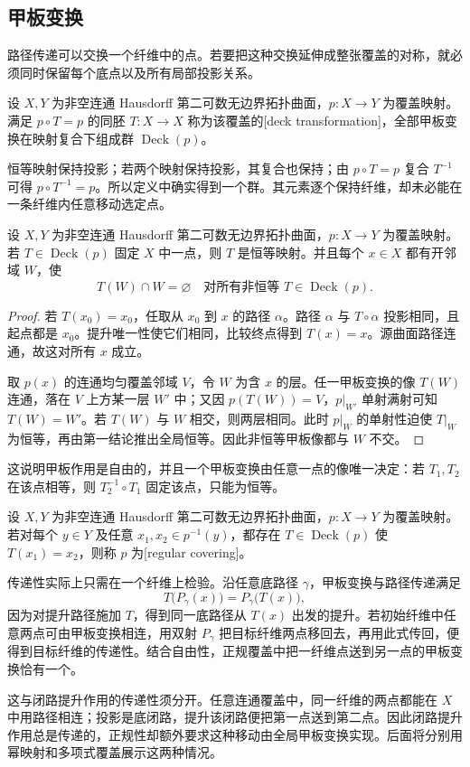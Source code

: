 \subsection{甲板变换}
\label{b3:subsec:110104}

路径传递可以交换一个纤维中的点。若要把这种交换延伸成整张覆盖的对称，就必须同时保留每个底点以及所有局部投影关系。

\begin{definition}\label{b3:def:11-deck}
设 \(X,Y\) 为非空连通 Hausdorff 第二可数无边界拓扑曲面，\(p:X\to Y\) 为覆盖映射。满足 \(p\circ T=p\) 的同胚 \(T:X\to X\) 称为该覆盖的[deck transformation]，全部甲板变换在映射复合下组成群 \(\operatorname{Deck}(p)\)。
\end{definition}
恒等映射保持投影；若两个映射保持投影，其复合也保持；由 \(p\circ T=p\) 复合 \(T^{-1}\) 可得 \(p\circ T^{-1}=p\)。所以定义中确实得到一个群。其元素逐个保持纤维，却未必能在一条纤维内任意移动选定点。

\begin{proposition}\label{b3:prop:11-deck-free}
设 \(X,Y\) 为非空连通 Hausdorff 第二可数无边界拓扑曲面，\(p:X\to Y\) 为覆盖映射。若 \(T\in\operatorname{Deck}(p)\) 固定 \(X\) 中一点，则 \(T\) 是恒等映射。并且每个 \(x\in X\) 都有开邻域 \(W\)，使
\[
 T(W)\cap W=\varnothing
 \quad\text{对所有非恒等 }T\in\operatorname{Deck}(p).
\]
\end{proposition}
\begin{proof}
若 \(T(x_0)=x_0\)，任取从 \(x_0\) 到 \(x\) 的路径 \(\alpha\)。路径 \(\alpha\) 与 \(T\circ\alpha\) 投影相同，且起点都是 \(x_0\)。提升唯一性使它们相同，比较终点得到 \(T(x)=x\)。源曲面路径连通，故这对所有 \(x\) 成立。

取 \(p(x)\) 的连通均匀覆盖邻域 \(V\)，令 \(W\) 为含 \(x\) 的层。任一甲板变换的像 \(T(W)\) 连通，落在 \(V\) 上方某一层 \(W'\) 中；又因 \(p(T(W))=V\)，\(p|_{W'}\) 单射满射可知 \(T(W)=W'\)。若 \(T(W)\) 与 \(W\) 相交，则两层相同。此时 \(p|_W\) 的单射性迫使 \(T|_W\) 为恒等，再由第一结论推出全局恒等。因此非恒等甲板像都与 \(W\) 不交。
\end{proof}
这说明甲板作用是自由的，并且一个甲板变换由任意一点的像唯一决定：若 \(T_1,T_2\) 在该点相等，则 \(T_2^{-1}\circ T_1\) 固定该点，只能为恒等。

\begin{definition}\label{b3:def:11-regular-cover}
设 \(X,Y\) 为非空连通 Hausdorff 第二可数无边界拓扑曲面，\(p:X\to Y\) 为覆盖映射。若对每个 \(y\in Y\) 及任意 \(x_1,x_2\in p^{-1}(y)\)，都存在 \(T\in\operatorname{Deck}(p)\) 使 \(T(x_1)=x_2\)，则称 \(p\) 为[regular covering]。
\end{definition}
传递性实际上只需在一个纤维上检验。沿任意底路径 \(\gamma\)，甲板变换与路径传递满足
\[
 T\bigl(P_\gamma(x)\bigr)=P_\gamma\bigl(T(x)\bigr),
\]
因为对提升路径施加 \(T\)，得到同一底路径从 \(T(x)\) 出发的提升。若初始纤维中任意两点可由甲板变换相连，用双射 \(P_\gamma\) 把目标纤维两点移回去，再用此式传回，便得到目标纤维的传递性。结合自由性，正规覆盖中把一纤维点送到另一点的甲板变换恰有一个。

\ProseParagraphBreak
这与闭路提升作用的传递性须分开。任意连通覆盖中，同一纤维的两点都能在 \(X\) 中用路径相连；投影是底闭路，提升该闭路便把第一点送到第二点。因此闭路提升作用总是传递的，正规性却额外要求这种移动由全局甲板变换实现。后面将分别用幂映射和多项式覆盖展示这两种情况。
